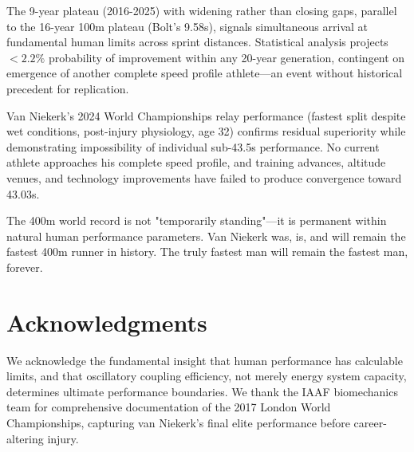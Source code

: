 \documentclass[twocolumn,10pt]{article}
\begin{document}
The 9-year plateau (2016-2025) with widening rather than closing gaps, parallel to the 16-year 100m plateau (Bolt's 9.58s), signals simultaneous arrival at fundamental human limits across sprint distances. Statistical analysis projects $<2.2\%$ probability of improvement within any 20-year generation, contingent on emergence of another complete speed profile athlete—an event without historical precedent for replication.

Van Niekerk's 2024 World Championships relay performance (fastest split despite wet conditions, post-injury physiology, age 32) confirms residual superiority while demonstrating impossibility of individual sub-43.5s performance. No current athlete approaches his complete speed profile, and training advances, altitude venues, and technology improvements have failed to produce convergence toward 43.03s.

The 400m world record is not "temporarily standing"—it is permanent within natural human performance parameters. Van Niekerk was, is, and will remain the fastest 400m runner in history. The truly fastest man will remain the fastest man, forever.

\section*{Acknowledgments}
We acknowledge the fundamental insight that human performance has calculable limits, and that oscillatory coupling efficiency, not merely energy system capacity, determines ultimate performance boundaries. We thank the IAAF biomechanics team for comprehensive documentation of the 2017 London World Championships, capturing van Niekerk's final elite performance before career-altering injury.



\end{document}
